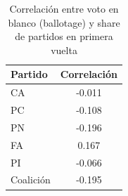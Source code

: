 \begin{table}
\caption{Correlación entre voto en blanco (ballotage) y share de partidos en primera vuelta}
\label{tab:blank_correlation}
\begin{tabular}{lc}
\toprule
Partido & Correlación \\
\midrule
CA & -0.011 \\
PC & -0.108 \\
PN & -0.196 \\
FA & 0.167 \\
PI & -0.066 \\
Coalición & -0.195 \\
\bottomrule
\end{tabular}
\end{table}
